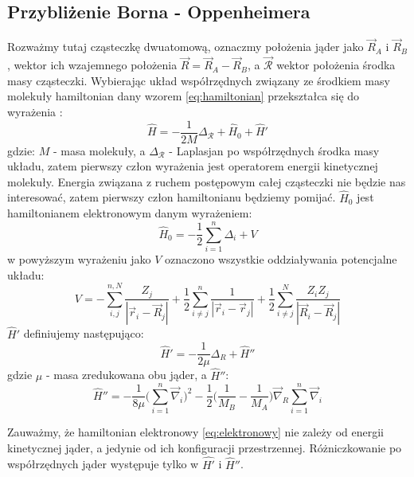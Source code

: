\documentclass[a4paper,12pt]{article}
\numberwithin{equation}{section}
\numberwithin{table}{section}
\numberwithin{figure}{section}
\begin{document}
\subsection{Przybliżenie Borna - Oppenheimera} \label{sec:born-oppenheimer}
Rozważmy tutaj cząsteczkę dwuatomową, oznaczmy położenia jąder jako $\vec{R}_A$ i $\vec{R}_B$, wektor ich wzajemnego położenia $\vec{R} = \vec{R}_A - \vec{R}_B$, a $\vec{\mathcal{R}}$ wektor położenia środka masy cząsteczki. Wybierając układ współrzędnych związany ze środkiem masy molekuły hamiltonian dany wzorem \eqref{eq:hamiltonian} przekształca się do wyrażenia \cite{piela}:
\begin{equation} \label{eq:ham_com}
\hat{H} = -\frac{1}{2M} \Delta_{\mathcal{R}} + \hat{H}_0 + \hat{H}'
\end{equation}
gdzie: $M$ - masa molekuły, a $\Delta_{\mathcal{R}}$ - Laplasjan po współrzędnych środka masy układu, zatem pierwszy człon wyrażenia jest operatorem energii kinetycznej molekuły.  Energia związana z ruchem postępowym całej cząsteczki nie będzie nas interesować, zatem pierwszy człon hamiltonianu będziemy pomijać.
$\hat{H}_0$ jest hamiltonianem elektronowym danym wyrażeniem:
\begin{equation} \label{eq:elektronowy}
\hat{H}_0 = -\frac{1}{2}\sum\limits_{i=1}^n \Delta_i + V 
\end{equation}
w powyższym wyrażeniu jako $V$ oznaczono wszystkie oddziaływania potencjalne układu:
\begin{equation}
V = -  \sum\limits_{i, j}^{n, N} \frac{Z_j}{|\vec{r}_i - \vec{R}_j|} + \frac{1}{2} \sum\limits_{i \neq j}^{n} \frac{1}{|\vec{r}_i - \vec{r}_j|} + \frac{1}{2} \sum\limits_{i \neq j}^{N} \frac{Z_i Z_j}{|\vec{R}_i - \vec{R}_j|}
\end{equation}
$\hat{H}'$ definiujemy następująco:
\begin{equation}
\hat{H}' = -\frac{1}{2\mu} \Delta_R + \hat{H}''
\end{equation}
gdzie $\mu$ - masa zredukowana obu jąder, a $\hat{H}''$:
\begin{equation}
\hat{H}'' = - \frac{1}{8\mu}\Big(\sum\limits_{i=1}^n \vec{\nabla}_i\Big)^2 - \frac{1}{2}\Big(\frac{1}{M_B} - \frac{1}{M_A}\Big) \vec{\nabla}_R \sum\limits_{i=1}^n \vec{\nabla}_i
\end{equation}

Zauważmy, że hamiltonian elektronowy \eqref{eq:elektronowy} nie zależy od energii kinetycznej jąder, a jedynie od ich konfiguracji przestrzennej. Różniczkowanie po współrzędnych jąder występuje tylko w $\hat{H'}$ i $\hat{H}''$.
\end{document}

